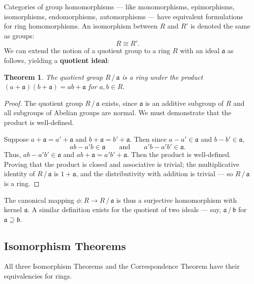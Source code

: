 \documentclass[11pt]{article}
\newtheorem{theorem}{Theorem}
\begin{document}
Categories of group homomorphisms --- like monomorphisms, epimorphisms, isomorphisms, endomorphisms, automorphisms --- have equivalent formulations for ring homomorphisms. An isomorphism between $R$ and $R'$ is denoted the same as groups:
\[
	R \cong R'.
\]
We can extend the notion of a quotient group to a ring $R$ with an ideal $\mathfrak{a}$ as follows, yielding a \textbf{quotient ideal}:

\begin{adjustwidth}{0.5cm}{}
	\begin{theorem}
		The quotient group $R \,/\, \mathfrak{a}$ is a ring under the product $(a + \mathfrak{a})(b + \mathfrak{a}) = ab + \mathfrak{a}$ for $a, b \in R$.
	\end{theorem}
	\begin{proof}
		The quotient group $R \,/\, \mathfrak{a}$ exists, since $\mathfrak{a}$ is an additive subgroup of $R$ and all subgroups of Abelian groups are normal. We must demonstrate that the product is well-defined.
		
		Suppose $a + \mathfrak{a} = a' + \mathfrak{a}$ and $b + \mathfrak{a} = b' + \mathfrak{a}$. Then since $a - a' \in \mathfrak{a}$ and $b - b' \in \mathfrak{a}$,
		\[
			ab - a'b \in \mathfrak{a} \qquad \text{and} \qquad a'b - a'b' \in \mathfrak{a}.
		\]
		Thus, $ab - a'b' \in \mathfrak{a}$ and $ab + \mathfrak{a} = a'b' + \mathfrak{a}$. Then the product is well-defined. Proving that the product is closed and associative is trivial; the multiplicative identity of $R \,/\, \mathfrak{a}$ is $1 + \mathfrak{a}$, and the distributivity with addition is trivial --- so $R \,/\, \mathfrak{a}$ is a ring.
	\end{proof}
\end{adjustwidth}

The canonical mapping $\phi : R \to R \,/\, \mathfrak{a}$ is thus a surjective homomorphism with kernel $\mathfrak{a}$. A similar definition exists for the quotient of two ideals --- say, $\mathfrak{a} \,/\, \mathfrak{b}$ for $\mathfrak{a} \supseteq \mathfrak{b}$.

\newpage


\subsection{Isomorphism Theorems}

All three Isomorphism Theorems and the Correspondence Theorem have their equivalencies for rings.
\end{document}
